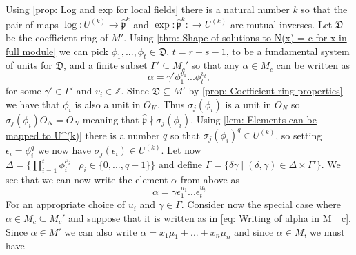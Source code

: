 \documentclass{article}
\newcommand{\mfrak}[1]{\mathfrak{#1}}
\newcommand{\mbb}[1]{\mathbb{#1}}
\numberwithin{equation}{section}
\begin{document}
Using \cref{prop: Log and exp for local fields} there is a natural number $k$ so that the pair of maps $\log : U^{(k)} \to \hat {\mfrak p}^k$
and $\exp : \hat {\mfrak p}^k : \to U^{(k)}$ are mutual inverses. Let $\mfrak D$ be the coefficient ring of $M'$. Using \cref{thm: Shape of solutions to N(x) = c for x in full module} we can pick $\phi_1, ..., \phi_t \in \mfrak D$, $t = r + s - 1$, to be a fundamental system of units for $\mfrak D$, and a finite subset $\Gamma' \subseteq M_c'$ so that any $\alpha \in M_c$ can be written as
$$\alpha = \gamma' \phi_1^{v_1} ... \phi_t^{v_t},$$
for some $\gamma' \in \Gamma'$ and $v_i \in \mbb Z$. Since $\mfrak D \subseteq M'$ by \cref{prop: Coefficient ring properties} we have that $\phi_i$ is also a unit in $O_K$. Thus $\sigma_j(\phi_i)$ is a unit in $O_N$ so $\sigma_j(\phi_i) O_N = O_N$ meaning that $\hat {\mfrak p} \nmid \sigma_j(\phi_i)$. Using \cref{lem: Elements can be mapped to U^(k)} there is a number $q$ so that $\sigma_j(\phi_i)^q \in U^{(k)}$, so setting $\epsilon_i = \phi_i^q$ we now have $\sigma_j(\epsilon_i) \in U^{(k)}$. Let now $\Delta = \{\prod_{i = 1}^t \phi_i^{\rho_i} \mid \rho_i \in \{0, ..., q-1 \} \}$ and define $\Gamma = \{\delta \gamma \mid (\delta, \gamma) \in \Delta \times \Gamma' \}$. We see that we can now write the element $\alpha$ from above as
\begin{equation}\label{eq: Writing of alpha in M'_c}
    \alpha = \gamma \epsilon_1^{u_1} ... \epsilon_t^{u_t}
\end{equation}
For an appropriate choice of $u_i$ and $\gamma \in \Gamma$. Consider now the special case where $\alpha \in M_c \subseteq M_c'$ and suppose that it is written as in \cref{eq: Writing of alpha in M'_c}. Since $\alpha \in M'$ we can also write
$\alpha = x_1 \mu_1 + ... + x_n \mu_n$ and since $\alpha \in M$, we must have
\end{document}
